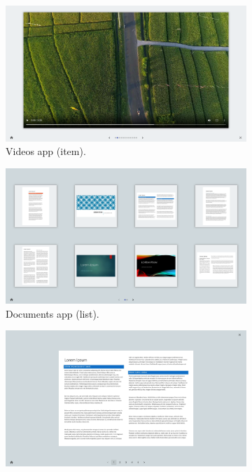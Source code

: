 \begin{figure}[ht]
        \begin{subfigure}{.32\textwidth}
            \centering
            \includegraphics[width=.96\linewidth]{Figures/LUI/UI/videos-fullscreen.pdf}  
            \vspace{-5pt}
            \captionsetup{width=.9\linewidth}
            \caption{Videos app (item).}
            \label{fig:lui:screenshots:videos-fullscreen}
        \end{subfigure}
        \begin{subfigure}{.32\textwidth}
            \centering
            \includegraphics[width=.96\linewidth]{Figures/LUI/UI/documents-list.pdf} 
            \vspace{-5pt}
            \captionsetup{width=.9\linewidth}
            \caption{Documents app (list).}
            \label{fig:lui:screenshots:documents-list}
        \end{subfigure}
        \begin{subfigure}{.32\textwidth}
            \centering
            \includegraphics[width=.96\linewidth]{Figures/LUI/UI/documents-fullscreen.pdf}  

\end{subfigure}
\end{figure}
